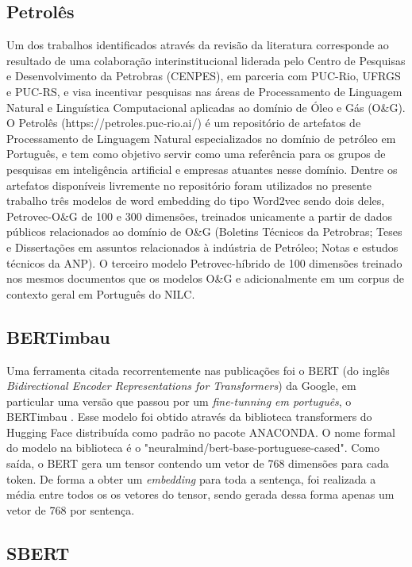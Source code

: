 \documentclass[conference]{IEEEtran}
\begin{document}
\subsection{Petrolês}
  
  Um dos trabalhos identificados através da revisão da literatura \cite{Gomes2021} corresponde ao resultado de uma colaboração interinstitucional liderada pelo Centro de Pesquisas e Desenvolvimento da Petrobras (CENPES), em parceria com PUC-Rio, UFRGS e PUC-RS, e visa incentivar pesquisas nas áreas de Processamento de Linguagem Natural e Linguística Computacional aplicadas ao domínio de Óleo e Gás (O\&G).
  O Petrolês (https://petroles.puc-rio.ai/) é um repositório de artefatos de Processamento de Linguagem Natural especializados no domínio de petróleo em Português, e tem como objetivo servir como uma referência para os grupos de pesquisas em inteligência artificial e empresas atuantes nesse domínio. Dentre os artefatos disponíveis livremente no repositório foram utilizados no presente trabalho três modelos de word embedding do tipo Word2vec sendo dois deles, Petrovec-O\&G de 100 e 300 dimensões, treinados unicamente a partir de dados públicos relacionados ao domínio de O\&G (Boletins Técnicos da Petrobras; Teses e Dissertações em assuntos relacionados à indústria de Petróleo; Notas e estudos técnicos da ANP). O terceiro modelo Petrovec-híbrido de 100 dimensões treinado nos mesmos documentos que os modelos O\&G e adicionalmente em um corpus de contexto geral em Português do NILC.

\subsection{BERTimbau}

  Uma ferramenta citada recorrentemente nas publicações foi o BERT (do inglês \textit{Bidirectional Encoder Representations for Transformers}) da Google, em particular uma versão que passou por um \textit{fine-tunning em português}, o BERTimbau \cite{souza2020bertimbau}. Esse modelo foi obtido através da biblioteca transformers do Hugging Face distribuída como padrão no pacote ANACONDA. O nome formal do modelo na biblioteca é o "neuralmind/bert-base-portuguese-cased". Como saída, o BERT gera um tensor contendo um vetor de 768 dimensões para cada token. De forma a obter um \textit{embedding} para toda a sentença, foi realizada a média entre todos os os vetores do tensor, sendo gerada dessa forma apenas um vetor de 768 por sentença. 

\subsection{SBERT}
\end{document}
